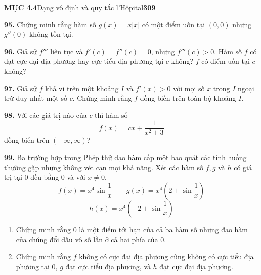 {\small\textsf{\textbf{MỤC 4.4}\quad Dạng vô định và quy tắc l'Hôpital}\hfill\textbf{\textsf{309}}}

\vspace{10pt}

\begin{minipage}[t]{0.48\textwidth}
  \fontsize{9pt}{12pt}\selectfont
  \textbf{95.} Chứng minh rằng hàm số $g(x) = x|x|$ có một điểm uốn tại $(0, 0)$ nhưng $g''(0)$ không tồn tại.

  \vspace{6pt}
  \textbf{96.} Giả sử $f'''$ liên tục và $f'(c) = f''(c) = 0$, nhưng $f'''(c) > 0$. Hàm số $f$ có đạt cực đại địa phương hay cực tiểu địa phương tại $c$ không? $f$ có điểm uốn tại $c$ không?

  \vspace{6pt}
  \textbf{97.} Giả sử $f$ khả vi trên một khoảng $I$ và $f'(x) > 0$ với mọi số $x$ trong $I$ ngoại trừ duy nhất một số $c$. Chứng minh rằng $f$ đồng biến trên toàn bộ khoảng $I$.

  \vspace{6pt}
  \textbf{98.} Với các giá trị nào của $c$ thì hàm số
  \[
    f(x) = cx + \frac{1}{x^2 + 3}
  \]
  đồng biến trên $(-\infty, \infty)$?
\end{minipage}\hfill\begin{minipage}[t]{0.48\textwidth}
  \fontsize{9pt}{12pt}\selectfont
  \textbf{99.} Ba trường hợp trong Phép thử đạo hàm cấp một bao quát các tình huống thường gặp nhưng không vét cạn mọi khả năng. Xét các hàm số $f, g$ và $h$ có giá trị tại $0$ đều bằng $0$ và với $x \neq 0$,
  \[
    f(x) = x^4 \sin \frac{1}{x} \qquad g(x) = x^4\left(2 + \sin\frac{1}{x}\right)
  \]
  \[
    h(x) = x^4\left(-2 + \sin\frac{1}{x}\right)
  \]
  \begin{enumerate}[label=\textnormal{(\alph*)}, leftmargin=*, itemsep=2pt, topsep=1pt, parsep=0pt]
    \item Chứng minh rằng 0 là một điểm tới hạn của cả ba hàm số nhưng đạo hàm của chúng đổi dấu vô số lần ở cả hai phía của 0.
    \item Chứng minh rằng $f$ không có cực đại địa phương cũng không có cực tiểu địa phương tại 0, $g$ đạt cực tiểu địa phương, và $h$ đạt cực đại địa phương.
  \end{enumerate}
\end{minipage}

\vspace{24pt}

